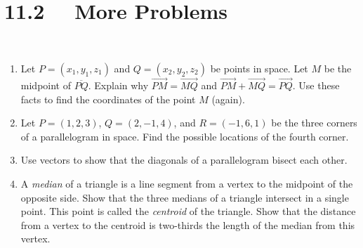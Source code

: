 \section*{11.2 \ \ More Problems}

\ 


\begin{enumerate}
\item  Let $P = (x_1, y_1, z_1)$ and $Q = (x_2, y_2, z_2)$ be points in space.  Let $M$ be the midpoint of $\overline{PQ}$. Explain why $\overrightarrow{PM} = \overrightarrow{MQ}$ and $\overrightarrow{PM} + \overrightarrow{MQ} = \overrightarrow{{PQ}}$.  Use these facts to find the coordinates of the point $M$ (again). \\

\item  Let $P = (1, 2, 3)$, $Q = (2, -1, 4)$, and $R = (-1, 6, 1)$ be the three corners of a parallelogram in space.  Find the possible locations of the fourth corner. \\

\item  Use vectors to show that the diagonals of a parallelogram bisect each other. \\

\item  A \emph{median} of a triangle is a line segment from a vertex to the midpoint of the opposite side.  Show that the three medians of a triangle intersect in a single point.  This point is called the \emph{centroid} of the triangle.  Show that the distance from a vertex to the centroid is two-thirds the length of the median from this vertex.  \\
\end{enumerate}